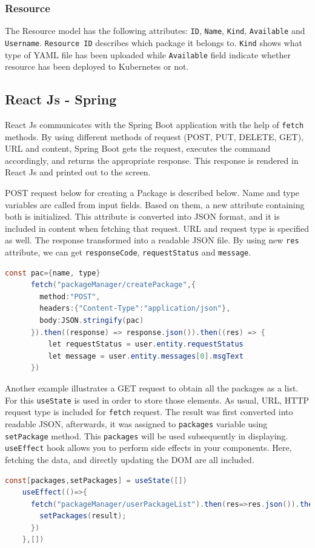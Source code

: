 \subsubsection{Resource}
The Resource model has the following attributes: \texttt{ID}, \texttt{Name}, \texttt{Kind}, \texttt{Available} and \texttt{Username}. \texttt{Resource ID} describes which package it belongs to. \texttt{Kind} shows what type of YAML file has been uploaded while \texttt{Available} field indicate whether resource has been deployed to Kubernetes or not.

\subsection{React Js - Spring}
\label{subsec:reactjs-spring}

React Js communicates with the Spring Boot application with the help of \texttt{fetch} methods. By using different methods of request (POST, PUT, DELETE, GET), URL and content, Spring Boot gets the request, executes the command accordingly, and returns the appropriate response. This response is rendered in React Js and printed out to the screen.

POST request below for creating a Package is described below. Name and type variables are called from input fields. Based on them, a new attribute containing both is initialized. This attribute is converted into JSON format, and it is included in content when fetching that request. URL and request type is specified as well. The response transformed into a readable JSON file. By using new \texttt{res} attribute, we can get \texttt{responseCode}, \texttt{requestStatus} and \texttt{message}.
\begin{lstlisting}[language={Java}]
        const pac={name, type}
      fetch("packageManager/createPackage",{
        method:"POST",
        headers:{"Content-Type":"application/json"},
        body:JSON.stringify(pac)
      }).then((response) => response.json()).then((res) => {
          let requestStatus = user.entity.requestStatus
          let message = user.entity.messages[0].msgText
      })
\end{lstlisting}

Another example illustrates a GET request to obtain all the packages as a list. For this \texttt{useState} is used in order to store those elements. As usual, URL, HTTP request type is included for \texttt{fetch} request. The result was first converted into readable JSON, afterwards, it was assigned to \texttt{packages} variable using \texttt{setPackage} method. This \texttt{packages} will be used subsequently in displaying. \texttt{useEffect} hook allows you to perform side effects in your components. Here, fetching the data, and directly updating the DOM are all included.
\begin{lstlisting}[language={Java}]
    const[packages,setPackages] = useState([])
    useEffect(()=>{
      fetch("packageManager/userPackageList").then(res=>res.json()).then((result)=>{
        setPackages(result);
      })
    },[])
\end{lstlisting}

